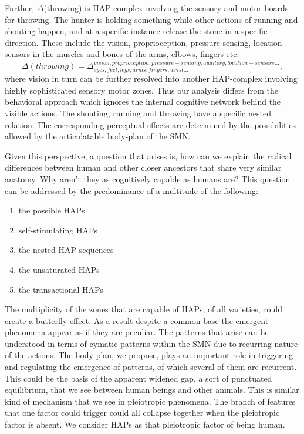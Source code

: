 Further, $\Delta$(throwing) is HAP-complex involving the sensory and motor boards for throwing. The hunter is holding something while other actions of running and shouting happen, and at a specific instance release the stone in a specific direction. These include the vision, proprioception, pressure-sensing, location sensors in the muscles and bones of the arms, elbows, fingers etc.
\begin{equation}\label{throwing-eq}
\Delta(throwing) = \Delta^{vision, proprioception, pressure-sensing, auditory, location-sensors...}_{eyes, feet, legs, arms, fingers, wrist...},    
\end{equation}
where vision in turn can be further resolved into another HAP-complex involving highly sophisticated sensory motor zones.
Thus our analysis differs from the behavioral approach which ignores the internal cognitive network behind the visible actions. The shouting, running and throwing have a specific nested relation. The corresponding perceptual effects are determined by the possibilities allowed by the articulatable body-plan of the SMN.

Given this perspective, a question that arises is, how can we explain the radical differences between human and other closer ancestors that share very similar anatomy. Why aren't they as cognitively capable as humans are? This question can be addressed by the predominance of a multitude of the following: 
\begin{enumerate}
    \item the possible HAPs
    \item self-stimulating HAPs
    \item the nested HAP sequences
    \item the unsaturated HAPs
    \item the transactional HAPs
\end{enumerate}

The multiplicity of the zones that are capable of HAPs, of all varieties, could create a butterfly effect. As a result despite a common base the emergent phenomena appear as if they are peculiar. The patterns that arise can be understood in terms of cymatic patterns within the SMN due to recurring nature of the actions. The body plan, we propose, plays an important role in triggering and regulating the emergence of patterns, of which several of them are recurrent. This could be the basis of the apparent widened gap, a sort of punctuated equilibrium, that we see between human beings and other animals. This is similar kind of mechanism that we see in pleiotropic phenomena. The branch of features that one factor could trigger could all collapse together when the pleiotropic factor is absent. We consider HAPs as that pleiotropic factor of being human. 

